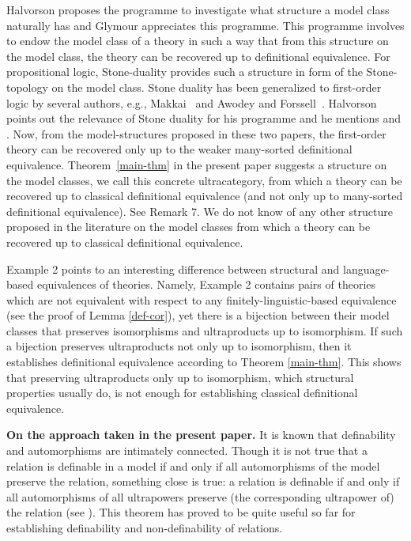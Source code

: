\documentclass[12pt,leqno]{article}
\begin{document}
Halvorson \cite[section 7]{Halwhat} proposes the programme to investigate what structure a model class naturally has and Glymour \cite[p.297]{Gly} appreciates this programme. This programme involves to endow the model class of a theory in such a way that from this structure on the model class, the theory can be recovered up to definitional equivalence. For propositional logic, Stone-duality provides such a structure in form of the Stone-topology on the model class. Stone duality has been generalized to first-order logic by several authors, e.g., Makkai~\cite{Makkai87} and Awodey and Forssell~\cite{Awo}. Halvorson points out the relevance of Stone duality for his programme and he mentions \cite{Makkai87} and \cite{Awo}.
%
Now, from the model-structures proposed in these two papers, the first-order theory can be recovered only up to the weaker many-sorted definitional equivalence. Theorem~\ref{main-thm} in the present paper suggests a structure on the model classes, we call this concrete ultracategory, from which a theory can be recovered up to classical definitional equivalence (and not only up to many-sorted definitional equivalence). See Remark 7.  We do not know of any other structure proposed in the literature on the model classes from which a theory can be recovered up to classical definitional equivalence. 

Example 2  points to an interesting difference between structural and language-based equivalences of theories.
Namely, Example 2 contains pairs of theories which are not equivalent with respect to any finitely-linguistic-based equivalence (see the proof of Lemma \ref{def-cor}), yet there is a bijection between their model classes that preserves isomorphisms and ultraproducts up to isomorphism. If such a bijection preserves ultraproducts not only up to isomorphism, then it establishes definitional equivalence according to Theorem \ref{main-thm}. This shows that preserving ultraproducts only up to isomorphism, which structural properties usually do, is not enough for establishing classical definitional equivalence.\bigskip

{\bf On the approach taken in the present paper.}
%
It is known that definability and automorphisms are intimately connected. Though it is not true that a relation is definable in a model if and only if all automorphisms of the model preserve the relation, something close is true: a relation is definable if and only if all automorphisms of all ultrapowers preserve (the corresponding ultrapower of) the relation (see \cite[Lemma 6.7.5]{pezs}). This theorem has proved to be quite useful so far for establishing definability and non-definability of relations. 
\end{document}
